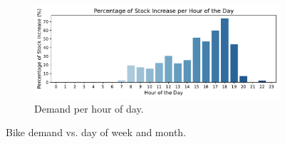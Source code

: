 \begin{figure}[htbp]
\begin{subfigure}{0.45\textwidth}
        \label{fig:demand month}
    \end{subfigure}
    \hfill
    \begin{subfigure}{0.8\textwidth}
        \centering
        \includegraphics[width=\textwidth]{demand_hour.pdf}
        \caption{Demand per hour of day.}
        \label{fig:demand hour}
    \end{subfigure}
    \caption{Bike demand vs. day of week and month.}
    \label{fig:demand day month}
\end{figure}

